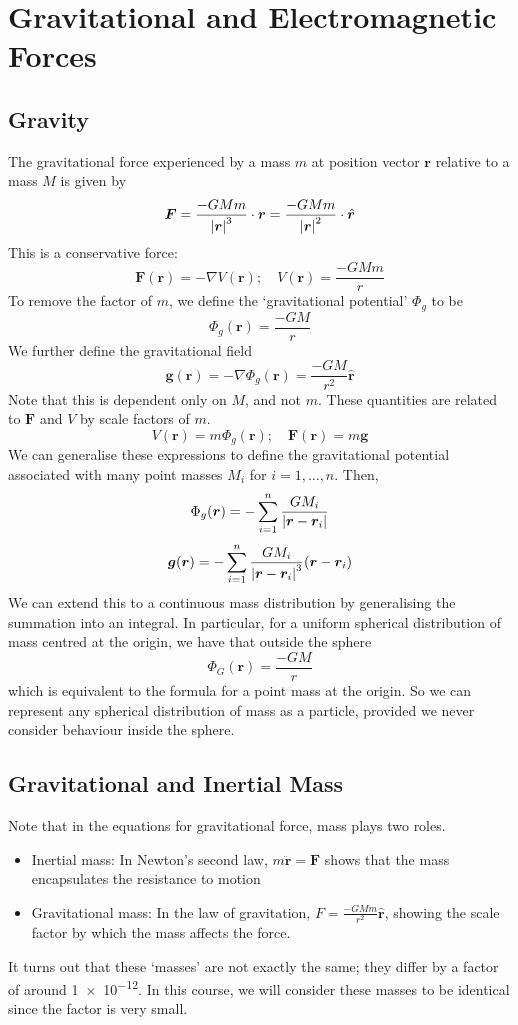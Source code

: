 \documentclass{article}
\begin{document}
\section{Gravitational and Electromagnetic Forces}
\subsection{Gravity}
The gravitational force experienced by a mass $m$ at position vector $\bm r$ relative to a mass $M$ is given by
\[ \bm F = \frac{- G M m}{\abs{\bm r}^3} \cdot \bm r = \frac{- G M m}{\abs{\bm r}^2} \cdot \hat{\bm r} \]
This is a conservative force:
\[ \bm F(\bm r) = -\nabla V(\bm r);\quad V(\bm r) = \frac{-GMm}{r} \]
To remove the factor of $m$, we define the `gravitational potential' $\Phi_g$ to be
\[ \Phi_g(\bm r) = \frac{-GM}{r} \]
We further define the gravitational field
\[ \bm g(\bm r) = -\nabla \Phi_g(\bm r) = \frac{-GM}{r^2}\hat{\bm r} \]
Note that this is dependent only on $M$, and not $m$. These quantities are related to $\bm F$ and $V$ by scale factors of $m$.
\[ V(\bm r) = m \Phi_g(\bm r);\quad \bm F(\bm r) = m\bm g \]
We can generalise these expressions to define the gravitational potential associated with many point masses $M_i$ for $i = 1, \dots, n$. Then,
\[ \Phi_g(\bm r) = -\sum_{i=1}^n \frac{GM_i}{\abs{\bm r - \bm r_i}} \]
\[ \bm g(\bm r) = -\sum_{i=1}^n \frac{GM_i}{\abs{\bm r - \bm r_i}^3}(\bm r - \bm r_i) \]
We can extend this to a continuous mass distribution by generalising the summation into an integral. In particular, for a uniform spherical distribution of mass centred at the origin, we have that outside the sphere
\[ \Phi_G(\bm r) = \frac{-GM}{r} \]
which is equivalent to the formula for a point mass at the origin. So we can represent any spherical distribution of mass as a particle, provided we never consider behaviour inside the sphere.

\subsection{Gravitational and Inertial Mass}
Note that in the equations for gravitational force, mass plays two roles.
\begin{itemize}
    \item Inertial mass: In Newton's second law, $m \ddot{\bm r} = \bm F$ shows that the mass encapsulates the resistance to motion
    \item Gravitational mass: In the law of gravitation, $F = \frac{-GMm}{r^2}\hat{\bm r}$, showing the scale factor by which the mass affects the force.
\end{itemize}
It turns out that these `masses' are not exactly the same; they differ by a factor of around \num{1e-12}. In this course, we will consider these masses to be identical since the factor is very small.
\end{document}
